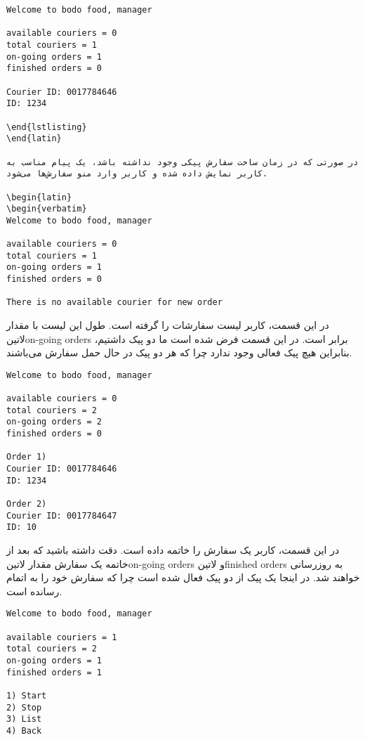 \begin{latin}
\begin{verbatim}
Welcome to bodo food, manager

available couriers = 0
total couriers = 1
on-going orders = 1
finished orders = 0

Courier ID: 0017784646
ID: 1234

\end{lstlisting}
\end{latin}

در صورتی که در زمان ساخت سفارش پیکی وجود نداشته باشد، یک پیام مناسب به کاربر نمایش داده شده و کاربر وارد منو سفارش‌ها می‌شود.

\begin{latin}
\begin{verbatim}
Welcome to bodo food, manager

available couriers = 0
total couriers = 1
on-going orders = 1
finished orders = 0

There is no available courier for new order
\end{verbatim}
\end{latin}

در این قسمت، کاربر لیست سفارشات را گرفته است. طول این لیست با مقدار ‌لاتین{on-going orders} برابر است. در این قسمت فرض شده است ما دو پیک داشتیم، بنابراین هیچ پیک فعالی وجود ندارد چرا که هر دو پیک در حال حمل سفارش می‌باشند.

\begin{latin}
\begin{verbatim}
Welcome to bodo food, manager

available couriers = 0
total couriers = 2
on-going orders = 2
finished orders = 0

Order 1)
Courier ID: 0017784646
ID: 1234

Order 2)
Courier ID: 0017784647
ID: 10

\end{verbatim}
\end{latin}

در این قسمت، کاربر یک سفارش را خاتمه داده است. دقت داشته باشید که بعد از خاتمه یک سفارش مقدار ‌لاتین{on-going orders} و ‌لاتین{finished orders} به روزرسانی خواهند شد. در اینجا یک پیک از دو پیک فعال شده است چرا که سفارش خود را به اتمام رسانده است.

\begin{latin}
\begin{verbatim}
Welcome to bodo food, manager

available couriers = 1
total couriers = 2
on-going orders = 1
finished orders = 1

1) Start
2) Stop
3) List
4) Back
\end{verbatim}
\end{latin}

